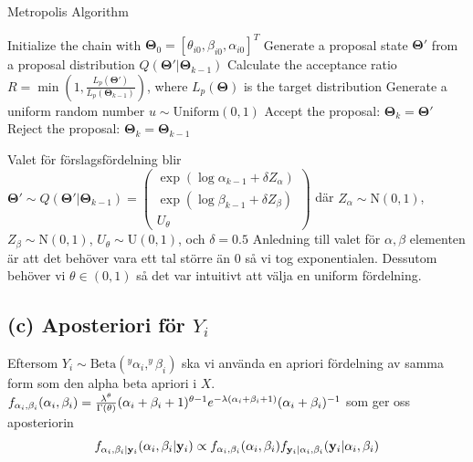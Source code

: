 \documentclass{assignment}
\begin{document}
\begin{algorithm}
    \caption{Metropolis Algorithm}
    \begin{algorithmic}[1]
    \State Initialize the chain with  $\mathbf{\Theta}_0=[\theta_{i0},\beta_{i0},\alpha_{i0}]^T$
     
    \State Generate a proposal state $\mathbf{\Theta}'$ from a proposal distribution $Q(\mathbf{\Theta}' | \mathbf{\Theta}_{k-1})$
    \State Calculate the acceptance ratio $R = \min\left(1, \frac{L_p(\mathbf{\Theta}')}{L_p(\mathbf{\Theta}_{k-1})}\right)$, where $L_p(\mathbf{\Theta})$ is the target distribution
    \State Generate a uniform random number $u \sim \text{Uniform}(0, 1)$
    \State Accept the proposal: $\mathbf{\Theta}_k = \mathbf{\Theta}' $
    \Else
    \State Reject the proposal: $\mathbf{\Theta}_{k}  = \mathbf{\Theta}_{k-1}$
    \EndIf
    \EndFor
    \end{algorithmic}
\end{algorithm}
Valet för förslagsfördelning blir $\mathbf{\Theta}'\sim Q(\mathbf{\Theta}'|\mathbf{\Theta}_{k-1}) = 
\begin{pmatrix}
    \exp(\log \alpha_{k-1} + \delta Z_\alpha)
    \\ \exp(\log \beta_{k-1} + \delta Z_\beta)
    \\ U_\theta
\end{pmatrix}$
där $Z_\alpha \sim \text{N}(0,1)$, $Z_\beta \sim \text{N}(0,1)$, $U_\theta \sim \text{U}(0,1)$, och $\delta = 0.5$
Anledning till valet för $\alpha,\beta$ elementen är att det behöver vara ett tal större än 0 så vi tog exponentialen. Dessutom behöver
vi $\theta\in (0,1)$ så det var intuitivt att välja en uniform fördelning.
\newpage
\subsection*{(c) Aposteriori för $Y_i$}
Eftersom $Y_i \sim \text{Beta}(^y\alpha_i,^y\beta_i)$ ska vi använda en apriori fördelning av samma form som den alpha beta apriori i $X$.
\\ $f_{\alpha_i,\beta_i}(\alpha_i,\beta_i) = \frac{\lambda^\theta}{\Gamma(\theta)}(\alpha_i+\beta_i+1)^{\theta-1}e^{-\lambda(\alpha_i+\beta_i+1)}(\alpha_i+\beta_i)^{-1}$  
som ger oss aposteriorin 
$$f_{\alpha_i,\beta_i|\mathbf{y}_i}(\alpha_i,\beta_i|\mathbf{y}_i)\propto f_{\alpha_i,\beta_i}(\alpha_i,\beta_i)f_{\mathbf{y}_i|\alpha_i,\beta_i}(\mathbf{y}_i|\alpha_i,\beta_i)$$
\end{document}

